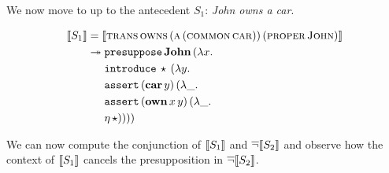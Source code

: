 We now move to up to the antecedent $S_1$: \emph{John owns a car}.

\begin{align*}
  \llbracket S_1 \rrbracket
  &= \llbracket \textsc{trans}\,\textsc{owns}\,(\textsc{a}\,(\textsc{common}\,\textsc{car}))\,(\textsc{proper}\,\textsc{John}) \rrbracket \\
  &\twoheadrightarrow \begin{aligned}[t]
      &\mathtt{presuppose}\,\textbf{John}\,(\lambda x.\,  \\
      &\mathtt{introduce}\,\star\,(\lambda y.\,  \\
      &\mathtt{assert}\,(\textbf{car}\,y)\,(\lambda \_.\,  \\
      &\mathtt{assert}\,(\textbf{own}\,x\,y)\,(\lambda \_.\,  \\
      &\eta\,\star))))
    \end{aligned}
\end{align*}

We can now compute the conjunction of $\llbracket S_1 \rrbracket$ and $\mathop{\overline{\lnot}} \llbracket S_2 \rrbracket$ and
observe how the context of $\llbracket S_1 \rrbracket$ cancels the presupposition in
$\mathop{\overline{\lnot}} \llbracket S_2 \rrbracket$.

